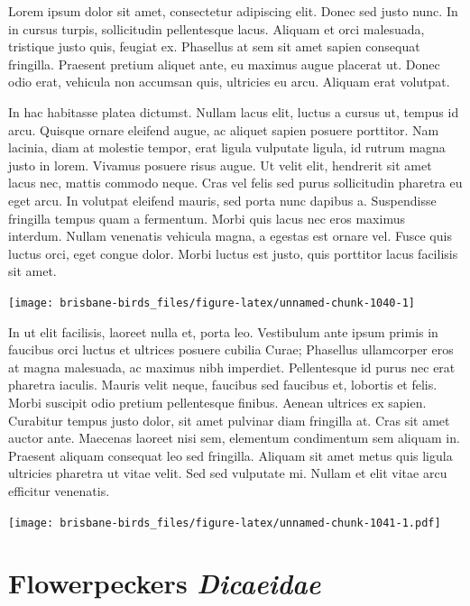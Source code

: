 \documentclass[]{book}
\let\origfigure\figure
\let\endorigfigure\endfigure
\renewenvironment{figure}[1][2] {
  \expandafter\origfigure\expandafter[H]
} {
  \endorigfigure
}
\begin{document}
Lorem ipsum dolor sit amet, consectetur adipiscing elit. Donec sed justo
nunc. In in cursus turpis, sollicitudin pellentesque lacus. Aliquam et
orci malesuada, tristique justo quis, feugiat ex. Phasellus at sem sit
amet sapien consequat fringilla. Praesent pretium aliquet ante, eu
maximus augue placerat ut. Donec odio erat, vehicula non accumsan quis,
ultricies eu arcu. Aliquam erat volutpat.

In hac habitasse platea dictumst. Nullam lacus elit, luctus a cursus ut,
tempus id arcu. Quisque ornare eleifend augue, ac aliquet sapien posuere
porttitor. Nam lacinia, diam at molestie tempor, erat ligula vulputate
ligula, id rutrum magna justo in lorem. Vivamus posuere risus augue. Ut
velit elit, hendrerit sit amet lacus nec, mattis commodo neque. Cras vel
felis sed purus sollicitudin pharetra eu eget arcu. In volutpat eleifend
mauris, sed porta nunc dapibus a. Suspendisse fringilla tempus quam a
fermentum. Morbi quis lacus nec eros maximus interdum. Nullam venenatis
vehicula magna, a egestas est ornare vel. Fusce quis luctus orci, eget
congue dolor. Morbi luctus est justo, quis porttitor lacus facilisis sit
amet.

\begin{figure}
\texttt{[image: brisbane-birds\_files/figure-latex/unnamed-chunk-1040-1]} \caption{insert figure caption}\label{fig:unnamed-chunk-1040}
\end{figure}

In ut elit facilisis, laoreet nulla et, porta leo. Vestibulum ante ipsum
primis in faucibus orci luctus et ultrices posuere cubilia Curae;
Phasellus ullamcorper eros at magna malesuada, ac maximus nibh
imperdiet. Pellentesque id purus nec erat pharetra iaculis. Mauris velit
neque, faucibus sed faucibus et, lobortis et felis. Morbi suscipit odio
pretium pellentesque finibus. Aenean ultrices ex sapien. Curabitur
tempus justo dolor, sit amet pulvinar diam fringilla at. Cras sit amet
auctor ante. Maecenas laoreet nisi sem, elementum condimentum sem
aliquam in. Praesent aliquam consequat leo sed fringilla. Aliquam sit
amet metus quis ligula ultricies pharetra ut vitae velit. Sed sed
vulputate mi. Nullam et elit vitae arcu efficitur venenatis.

\begin{figure}
\centering
\texttt{[image: brisbane-birds\_files/figure-latex/unnamed-chunk-1041-1.pdf]}
\caption{\label{fig:unnamed-chunk-1041}insert figure caption}
\end{figure}

\chapter{\texorpdfstring{Flowerpeckers
\emph{Dicaeidae}}{Flowerpeckers Dicaeidae}}\label{flowerpeckers-dicaeidae}
\end{document}
